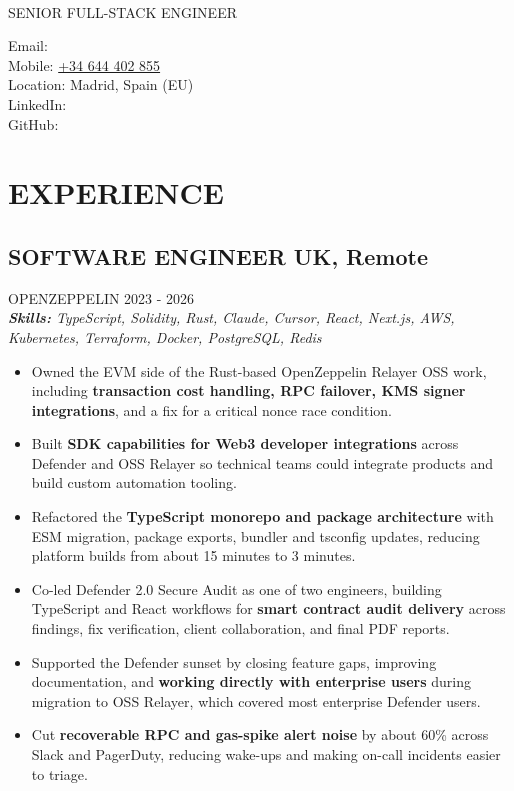 \documentclass{article}
\newcommand{\WorkExperience}[2]{
   \subsection*{#1}
   \vspace{-1em}
   \uppercase{#2}
}
\newcommand{\Skills}[1]{
   \textit{\textbf{Skills:} #1}
}
\begin{document}
\begin{center}
	\begin{minipage}{0.5\textwidth}
		{\fontsize{24}{28}\Title{}} \\
		\bigskip
		{\normalsize \MakeUppercase{Senior Full-Stack Engineer}}
	\end{minipage} \hfill
	\begin{minipage}{0.4\textwidth}
		\raggedleft{}
		Email: \href{mailto:\ResumeEmail}{\ResumeEmail} \\
		Mobile: \href{tel:+34644402855}{+34 644 402 855}  \\
		Location: Madrid, Spain (EU) \\
		LinkedIn: \href{\ResumeLinkedInUrl}{\ResumeLinkedInLabel} \\
		GitHub: \href{\ResumeGitHubUrl}{\ResumeGitHubLabel}
	\end{minipage}
\end{center}

\vspace{-3em}

\phantom{Amazon, Microsoft, Facebook} %

\section*{EXPERIENCE}
\WorkExperience{SOFTWARE ENGINEER \hfill UK, Remote}{OpenZeppelin \hfill 2023 {-} 2026} \\
\Skills{TypeScript, Solidity, Rust, Claude, Cursor, React, Next.js, AWS, Kubernetes, Terraform, Docker, PostgreSQL, Redis}
\begin{itemize}
	\item Owned the EVM side of the Rust-based OpenZeppelin Relayer OSS work, including \textbf{transaction cost handling, RPC failover, KMS signer integrations}, and a fix for a critical nonce race condition.
	\item Built \textbf{SDK capabilities for Web3 developer integrations} across Defender and OSS Relayer so technical teams could integrate products and build custom automation tooling.
	\item Refactored the \textbf{TypeScript monorepo and package architecture} with ESM migration, package exports, bundler and tsconfig updates, reducing platform builds from about 15 minutes to 3 minutes.
	\item Co-led Defender 2.0 Secure Audit as one of two engineers, building TypeScript and React workflows for \textbf{smart contract audit delivery} across findings, fix verification, client collaboration, and final PDF reports.
	\item Supported the Defender sunset by closing feature gaps, improving documentation, and \textbf{working directly with enterprise users} during migration to OSS Relayer, which covered most enterprise Defender users.
	\item Cut \textbf{recoverable RPC and gas-spike alert noise} by about 60\% across Slack and PagerDuty, reducing wake-ups and making on-call incidents easier to triage.
\end{itemize}
\end{document}

